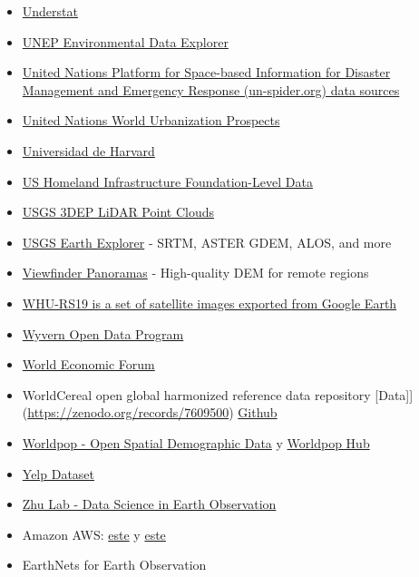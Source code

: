\documentclass[
]{article}
\begin{document}
\begin{itemize}
{  recopilación de datasets públicos}
\item
  \href{https://understat.com/}{Understat}
\item
  \href{https://www.unep.org/publications-data}{UNEP Environmental Data
  Explorer}
\item
  \href{https://un-spider.org/links-and-resources/data-sources}{United
  Nations Platform for Space-based Information for Disaster Management
  and Emergency Response (un-spider.org) data sources}
\item
  \href{https://population.un.org/wup/}{United Nations World
  Urbanization Prospects}
\item
  \href{https://dataverse.harvard.edu/}{Universidad de Harvard}
\item
  \href{https://hifld-geoplatform.hub.arcgis.com/}{US Homeland
  Infrastructure Foundation-Level Data}
\item
  \href{https://registry.opendata.aws/usgs-lidar/}{USGS 3DEP LiDAR Point
  Clouds}
\item
  \href{https://earthexplorer.usgs.gov/}{USGS Earth Explorer} - SRTM,
  ASTER GDEM, ALOS, and more
\item
  \href{https://viewfinderpanoramas.org/}{Viewfinder Panoramas} -
  High-quality DEM for remote regions
\item
  \href{https://paperswithcode.com/dataset/whu-rs19}{WHU-RS19 is a set
  of satellite images exported from Google Earth}
\item
  \href{https://wyvern.space/open-data/}{Wyvern Open Data Program}
\item
  \href{https://www.weforum.org/publications/}{World Economic Forum}
\item
  WorldCereal open global harmonized reference data repository
  {[}Data{]}{]}(\url{https://zenodo.org/records/7609500})
  \href{https://github.com/WorldCereal/worldcereal-classification}{Github}
\item
  \href{https://www.worldpop.org/}{Worldpop - Open Spatial Demographic
  Data} y \href{https://hub.worldpop.org/}{Worldpop Hub}
\item
  \href{https://business.yelp.com/data/resources/open-dataset/}{Yelp
  Dataset}
\item
  \href{https://github.com/zhu-xlab}{Zhu Lab - Data Science in Earth
  Observation}
\item
  Amazon AWS: \href{http://aws.amazon.com/es/datasets/}{este} y
  \href{https://aws.amazon.com/es/public-data-sets/}{este}
\item
  EarthNets for Earth Observation

\end{itemize}
\end{document}
